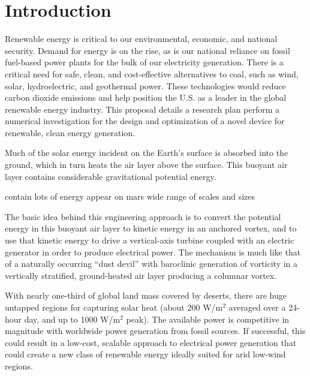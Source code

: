 \section{Introduction}

Renewable energy is critical to our environmental, economic, and
national security. Demand for energy is on the rise, as is our national
reliance on fossil fuel-based power plants for the bulk of our
electricity generation. There is a critical need for safe, clean, and
cost-effective alternatives to coal, such as wind, solar, hydroelectric,
and geothermal power\cite{arpa-e}. These technologies would reduce carbon dioxide
emissions and help position the U.S. as a leader in the global renewable
energy industry. 
%
%
This proposal details a research plan perform a numerical investigation
for the design and optimization of a novel device for renewable, clean
energy generation. 

Much of the solar energy incident on the Earth's surface is absorbed
into the ground, which in turn heats the air layer above the surface.
This buoyant air layer contains considerable gravitational potential
energy. 



contain lots of energy
appear on mars
wide range of scales and sizes



The basic idea behind this engineering approach is to convert the 
potential energy in this buoyant air layer to kinetic energy in an
anchored vortex, and to use that kinetic energy to drive a
vertical-axis turbine coupled with an electric generator in order to
produce electrical power. The mechanism is much like that of a naturally
%
%
occurring ``dust devil'' with baroclinic generation of vorticity in a
vertically stratified, ground-heated air layer producing a columnar vortex. 

With nearly one-third of global land mass covered by deserts, there are huge
untapped regions for capturing solar heat (about 200 W/$\text{m}^2$ averaged over
a 24-hour day, and up to 1000 W/$\text{m}^2$ peak).  The available power is
competitive in magnitude with worldwide power generation from fossil
sources. If successful, this could result in a low-cost, scalable
approach to electrical power generation that could create a new class of
renewable energy ideally suited for arid low-wind regions. 

